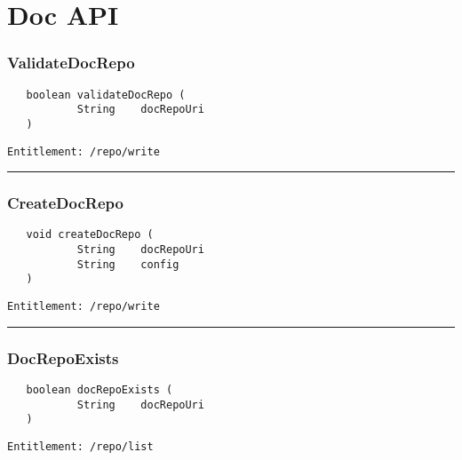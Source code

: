 \chapter{Doc API}

\subsection{ValidateDocRepo}
\label{Api:ValidateDocRepo}
\begin{Verbatim}
   boolean validateDocRepo (
           String    docRepoUri
   )
\end{Verbatim}
\begin{Verbatim}[formatcom=\color{Maroon}]
  Entitlement: /repo/write
\end{Verbatim}



\rule{12cm}{2pt}
\subsection{CreateDocRepo}
\label{Api:CreateDocRepo}
\begin{Verbatim}
   void createDocRepo (
           String    docRepoUri
           String    config
   )
\end{Verbatim}
\begin{Verbatim}[formatcom=\color{Maroon}]
  Entitlement: /repo/write
\end{Verbatim}



\rule{12cm}{2pt}
\subsection{DocRepoExists}
\label{Api:DocRepoExists}
\begin{Verbatim}
   boolean docRepoExists (
           String    docRepoUri
   )
\end{Verbatim}
\begin{Verbatim}[formatcom=\color{Maroon}]
  Entitlement: /repo/list
\end{Verbatim}



